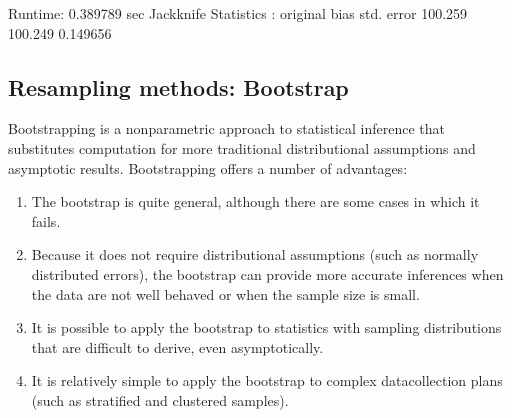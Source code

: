 \documentclass[letterpaper,10pt,english]{sphinxmanual}
\begin{document}
\begin{sphinxVerbatim}[commandchars=\\\{\}]
     


 
     


    
  
    
   
\end{sphinxVerbatim}

\begin{sphinxVerbatim}[commandchars=\\\{\}]
Runtime: 0.389789 sec
Jackknife Statistics :
original           bias      std. error
 100.259        100.249        0.149656
\end{sphinxVerbatim}


\subsection{Resampling methods: Bootstrap}
\label{\detokenize{chapter4:resampling-methods-bootstrap}}
Bootstrapping is a nonparametric approach to statistical inference
that substitutes computation for more traditional distributional
assumptions and asymptotic results. Bootstrapping offers a number of
advantages:
\begin{enumerate}
%
\item {} 
The bootstrap is quite general, although there are some cases in which it fails.

\item {} 
Because it does not require distributional assumptions (such as normally distributed errors), the bootstrap can provide more accurate inferences when the data are not well behaved or when the sample size is small.

\item {} 
It is possible to apply the bootstrap to statistics with sampling distributions that are difficult to derive, even asymptotically.

\item {} 
It is relatively simple to apply the bootstrap to complex data\sphinxhyphen{}collection plans (such as stratified and clustered samples).

\end{enumerate}
\end{document}
